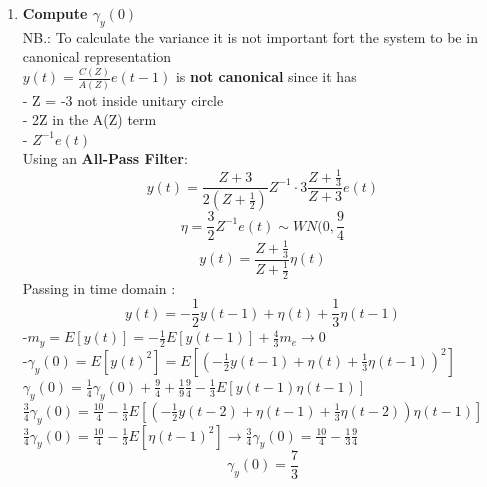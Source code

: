 \begin{enumerate}

\item \textbf{Compute $\gamma_y(0)$}\\
NB.: To calculate the variance it is not important fort the system to be in canonical representation\\
$y(t) = \frac{C(Z)}{A(Z)}e(t-1) $ is \textbf{not canonical} since it has \\
- Z = -3 not inside unitary circle\\
- 2Z in the A(Z) term\\
- $Z^{-1}e(t)$\\
Using an \textbf{All-Pass Filter}: 
$$ y(t) = \frac{Z+3}{2(Z+\frac{1}{2})} Z^{-1} \cdot 3 \frac{Z+\frac{1}{3}}{Z+3}e(t)$$
$$ \eta = \frac{3}{2}Z^{-1}e(t) \sim WN(0,\frac{9}{4}$$
$$ y(t) = \frac{Z+\frac{1}{3}}{Z+\frac{1}{2}}\eta(t)$$
Passing in time domain : $$ y(t)= -\frac{1}{2}y(t-1)+\eta(t) +\frac{1}{3}\eta(t-1)$$
-$m_y = E[y(t)]= -\frac{1}{2}E[y(t-1)]+\frac{4}{3}m_e \to 0$\\
-$\gamma_y(0) = E[y(t)^2] = E[(-\frac{1}{2}y(t-1) + \eta(t) + \frac{1}{3}\eta(t-1))^2]$\\
  $\gamma_y(0) = \frac{1}{4}\gamma_y(0) + \frac{9}{4} + \frac{1}{9}\frac{9}{4} - \frac{1}{3}E[y(t-1)\eta(t-1)]$\\
  $\frac{3}{4}\gamma_y(0) =\frac{10}{4} - \frac{1}{3}E[(-\frac{1}{2}y(t-2)+\eta(t-1)+\frac{1}{3}\eta(t-2))\eta(t-1)] $\\
  $\frac{3}{4}\gamma_y(0) = \frac{10}{4} -\frac{1}{3}E[\eta(t-1)^2] \to \frac{3}{4}\gamma_y(0) = \frac{10}{4} -\frac{1}{3}\frac{9}{4}$
 \[
 \boxed{\gamma_y(0)=\frac{7}{3}}
 \]


\end{enumerate}
